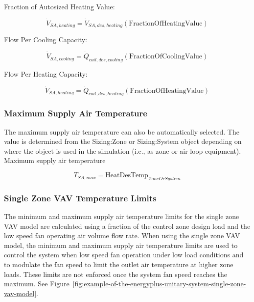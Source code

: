 Fraction of Autosized Heating Value:

\begin{equation}
\dot V_{SA,heating} = \dot V_{SA,des,heating}\left(\text{FractionOfHeatingValue}\right)
\end{equation}

Flow Per Cooling Capacity:

\begin{equation}
\dot V_{SA,cooling} = \dot Q_{coil,des,cooling}\left(\text{FractionOfCoolingValue}\right)
\end{equation}

Flow Per Heating Capacity:

\begin{equation}
\dot V_{SA,heating} = \dot Q_{coil,des,heating}\left(\text{FractionOfHeatingValue}\right)
\end{equation}

\subsubsection{Maximum Supply Air Temperature}\label{maximum-supply-air-temperature}

The maximum supply air temperature can also be automatically selected. The value is determined from the Sizing:Zone or Sizing:System object depending on where the object is used in the simulation (i.e., as zone or air loop equipment). Maximum supply air temperature

\begin{equation}
T_{SA,max} = \text{HeatDesTemp}_{ZoneOrSystem}
\end{equation}

\subsubsection{Single Zone VAV Temperature Limits}\label{single-zone-vav-temperature-limits}

The minimum and maximum supply air temperature limits for the single zone VAV model are calculated using a fraction of the control zone design load and the low speed fan operating air volume flow rate. When using the single zone VAV model, the minimum and maximum supply air temperature limits are used to control the system when low speed fan operation under low load conditions and to modulate the fan speed to limit the outlet air temperature at higher zone loads. These limits are not enforced once the system fan speed reaches the maximum. See Figure~\ref{fig:example-of-the-energyplus-unitary-system-single-zone-vav-model}.

